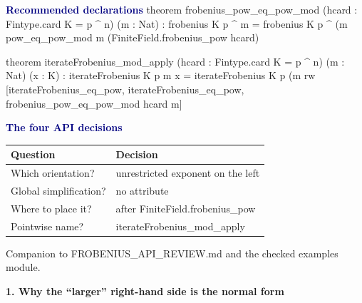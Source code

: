\documentclass[10pt]{article}
\newenvironment{leansmall}{\Verbatim[fontsize=\scriptsize,frame=single,framesep=1.5mm,rulecolor=\color{blue!35},formatcom=\leanfont]}{\endVerbatim}
\newcommand{\code}[1]{{\leanfont #1}}
\newcommand{\decision}[1]{\textcolor{navy}{\bfseries #1}}
\begin{document}
\vspace{2mm}
\begin{minipage}[t]{.48\textwidth}
\decision{Recommended declarations}
\begin{leansmall}
theorem frobenius_pow_eq_pow_mod
    (hcard : Fintype.card K = p ^ n) (m : Nat) :
    frobenius K p ^ m =
      frobenius K p ^ (m %
  pow_eq_pow_mod m (FiniteField.frobenius_pow hcard)

 theorem iterateFrobenius_mod_apply
    (hcard : Fintype.card K = p ^ n)
    (m : Nat) (x : K) :
    iterateFrobenius K p m x =
      iterateFrobenius K p (m %
  rw [iterateFrobenius_eq_pow,
      iterateFrobenius_eq_pow,
      frobenius_pow_eq_pow_mod hcard m]
\end{leansmall}
\end{minipage}\hfill
\begin{minipage}[t]{.48\textwidth}
\decision{The four API decisions}
\begin{center}
\renewcommand{\arraystretch}{1.35}
\begin{tabular}{>{\raggedright\arraybackslash}p{.40\linewidth}p{.49\linewidth}}
\toprule
Question & Decision\\ \midrule
Which orientation? & unrestricted exponent on the left\\
Global simplification? & no \code{[simp]} attribute\\
Where to place it? & after \code{FiniteField.frobenius\_pow}\\
Pointwise name? & \code{iterateFrobenius\_mod\_apply}\\
\bottomrule
\end{tabular}
\end{center}

\vspace{2mm}
\end{minipage}

\vfill
\begin{center}\small\color{muted}Companion to \code{FROBENIUS\_API\_REVIEW.md} and the checked examples module.\end{center}
\newpage

\begin{center}
{\Large\bfseries\color{navy} 1. Why the ``larger'' right-hand side is the normal form}
\end{center}
\end{document}
